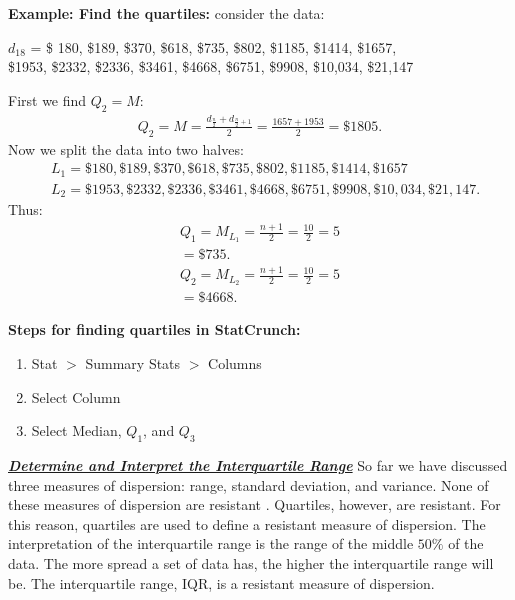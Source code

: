 \documentclass{report}
\begin{document}
       \pagebreak \bigbreak \noindent
       \bigbreak \noindent 
       \begin{mdframed}
         \textbf{Example: Find the quartiles:}
         \bigbreak \noindent 
         consider the data:
         \begin{center}
             $d_{18}$  =  \$ 180, \$189, \$370, \$618, \$735, \$802, \$1185, \$1414, \$1657,\\ 
             \$1953, \$2332, \$2336, \$3461, \$4668, \$6751, \$9908, \$10,034, \$21,147
         \end{center}
         \bigbreak \noindent 
         First we find $Q_{2} = M $:
         \begin{align*}
             Q_{2} = M = \frac{d_{\frac{n}{2}} + d_{\frac{n}{2}+1}}{2} = \frac{1657 + 1953}{2} = \$1805
         .\end{align*}
         \bigbreak \noindent 
         Now we split the data into two halves:
         \begin{align*}
             &L_{1} = \$180, \$189, \$370, \$618, \$735, \$802, \$1185, \$1414, \$1657 \\ &L_{2} = \$1953, \$2332, \$2336, \$3461, \$4668, \$6751, \$9908, \$10,034, \$21,147
         .\end{align*}
         \bigbreak \noindent 
         Thus:
         \begin{align*}
             Q_{1} = M_{L_{1}} = \frac{n+1}{2} = \frac{10}{2} = 5 \\
             = \$735
         .\end{align*}
         \begin{align*}
             Q_{2} = M_{L_{2}} = \frac{n+1}{2} = \frac{10}{2} = 5 \\
             = \$4668
         .\end{align*}
       \end{mdframed}

       \bigbreak \noindent 
       \textbf{Steps for finding quartiles in StatCrunch:}
       \begin{enumerate}
           \item Stat $> $ Summary Stats $> $ Columns 
            \item Select Column
            \item Select Median, $Q_{1}$, and $Q_{3} $
       \end{enumerate}


       \bigbreak \noindent \bigbreak \noindent 
       \textbf{\textit{\underline{Determine and Interpret the Interquartile Range}}}
       \bigbreak \noindent 
       So far we have discussed three measures of dispersion: range, standard deviation, and variance. None of these measures of dispersion are resistant . Quartiles, however, are resistant. For this reason, quartiles are used to define a resistant measure of dispersion.
       \bigbreak \noindent 
       The interpretation of the interquartile range is the range of the middle $50\% $ of the data. The more spread a set of data has, the higher the interquartile range will be. The interquartile range, IQR, is a resistant measure of dispersion.
\end{document}
